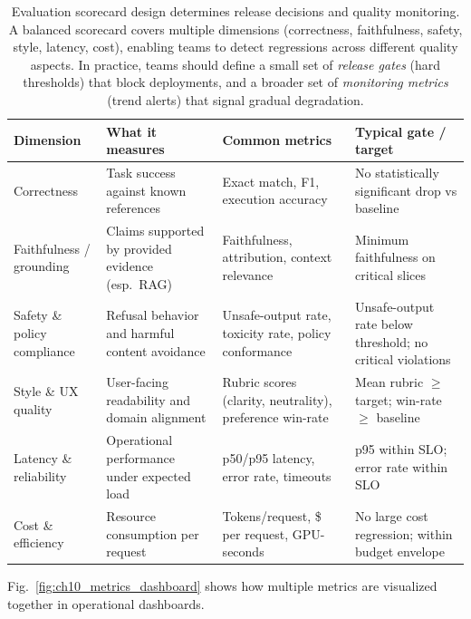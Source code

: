 \begin{table}[t]
\centering
\caption{Evaluation scorecard design determines release decisions and quality monitoring. A balanced scorecard covers multiple dimensions (correctness, faithfulness, safety, style, latency, cost), enabling teams to detect regressions across different quality aspects. In practice, teams should define a small set of \emph{release gates} (hard thresholds) that block deployments, and a broader set of \emph{monitoring metrics} (trend alerts) that signal gradual degradation.}
\label{tab:ch10_scorecard}
\small
\setlength{\tabcolsep}{6pt}
\renewcommand{\arraystretch}{1.3}
\begin{tabularx}{\linewidth}{@{}p{2.4cm}X p{3.2cm} p{2.6cm}@{}}
\toprule
\rowcolor{gray!15}
\textbf{Dimension} & \textbf{What it measures} & \textbf{Common metrics} & \textbf{Typical gate / target} \\
\midrule
Correctness &
Task success against known references &
Exact match\index{exact match}, F1\index{F1}, execution accuracy\index{accuracy!execution} &
No statistically significant drop vs baseline \\
\midrule
Faithfulness / grounding &
Claims supported by provided evidence (esp.\ RAG) &
Faithfulness, attribution, context relevance &
Minimum faithfulness on critical slices \\
\midrule
Safety \& policy compliance &
Refusal behavior and harmful content avoidance &
Unsafe-output rate, toxicity rate, policy conformance &
Unsafe-output rate below threshold; no critical violations \\
\midrule
Style \& UX quality &
User-facing readability and domain alignment &
Rubric scores (clarity, neutrality), preference win-rate &
Mean rubric $\geq$ target; win-rate $\geq$ baseline \\
\midrule
Latency \& reliability &
Operational performance under expected load &
p50\index{p50}/p95\index{p95} latency, error rate\index{error rate}, timeouts\index{timeout} &
p95 within SLO; error rate within SLO \\
\midrule
Cost \& efficiency &
Resource consumption per request &
Tokens/request, \$ per request, GPU-seconds &
No large cost regression; within budget envelope \\
\bottomrule
\end{tabularx}
\end{table}

Fig.~\ref{fig:ch10_metrics_dashboard} shows how multiple metrics are visualized together in operational dashboards.

